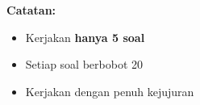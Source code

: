 \documentclass[10pt]{article}
\begin{document}
\vspace{1cm}

\noindent\textbf{Catatan:}
\begin{itemize}
    \item Kerjakan \textbf{hanya 5 soal}
    \item Setiap soal berbobot 20
    \item Kerjakan dengan penuh kejujuran
\end{itemize}
\newpage
\end{document}
